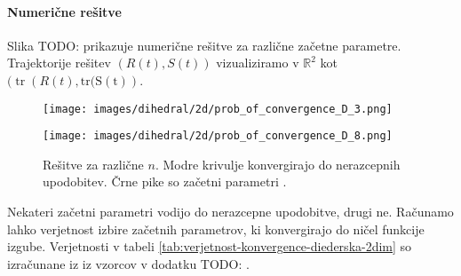 \documentclass[mat2, tisk]{fmfdelo}
\newcommand{\TODO}[1]{{\color{blue} TODO: #1}}
\newcommand{\R}{\mathbb R}
\begin{document}
        \paragraph{Numerične rešitve} 
        Slika \TODO prikazuje numerične rešitve za različne začetne parametre. Trajektorije rešitev $(R(t), S(t))$ vizualiziramo v $\R^2$ kot $(\operatorname{tr}(R(t), \operatorname{tr(S(t)})$. 
        \begin{figure}[h!]
            \centering
                      \begin{minipage}{0.49\textwidth}
                            \centering
                            \texttt{[image: images/dihedral/2d/prob\_of\_convergence\_D\_3.png]}
                            \caption*{$n=3$}
                        \end{minipage} 
                    \begin{minipage}{0.49\textwidth}
                            \centering
                            \texttt{[image: images/dihedral/2d/prob\_of\_convergence\_D\_8.png]}
                            \caption*{$n=8$}
                        \end{minipage} 
            \caption[Rešitve za različne $n$. Modre krivulje konvergirajo do nerazcepnih upodobitev. Črne pike so začetni parametri]{Rešitve za različne $n$. Modre krivulje konvergirajo do nerazcepnih upodobitev. Črne pike so začetni parametri\footnotemark
            .}
            \label{fig:diederska-2dim-trajektorije}
        \end{figure}
        Nekateri začetni parametri vodijo do nerazcepne upodobitve, drugi ne. Računamo lahko verjetnost izbire začetnih parametrov, ki konvergirajo do ničel funkcije izgube. Verjetnosti v tabeli \ref{tab:verjetnost-konvergence-diederska-2dim} so izračunane iz iz vzorcov v dodatku \TODO.  
\end{document}
